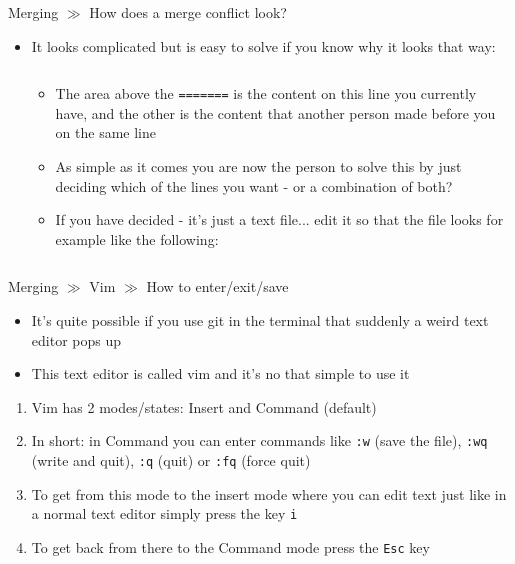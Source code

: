 \documentclass[10pt]{beamer}
\begin{document}
\begin{frame}{Merging $\gg$ How does a merge conflict look?}
\begin{itemize}
	\item It looks complicated but is easy to solve if you know why it looks that way:
	\inputminted[bgcolor=lightGreyCustom,fontsize=\scriptsize]{sh}{./resources/git_merging_04_create_conflict_output.sh}
	\begin{itemize}
		\item The area above the \texttt{=======} is the content on this line you currently have, and the other is the content that another person made before you on the same line
		\item As simple as it comes you are now the person to solve this by just deciding which of the lines you want - or a combination of both?
		\item If you have decided - it's just a text file... edit it so that the file looks for example like the following:
		\inputminted[bgcolor=lightGreyCustom,fontsize=\scriptsize]{sh}{./resources/git_merging_05_create_conflict_solved.sh}
	\end{itemize}
\end{itemize}
\end{frame}

\begin{frame}{Merging $\gg$ Vim $\gg$ How to enter/exit/save}
\begin{itemize}
\item It's quite possible if you use git in the terminal that suddenly a weird text editor pops up
\item This text editor is called vim and it's no that simple to use it
\end{itemize}
\begin{enumerate}
	\item Vim has 2 modes/states: Insert and Command (default)
	\item In short: in Command you can enter commands like \texttt{:w} (save the file), \texttt{:wq} (write and quit), \texttt{:q} (quit) or \texttt{:fq} (force quit)
	\item To get from this mode to the insert mode where you can edit text just like in a normal text editor simply press the key \texttt{i}
	\item To get back from there to the Command mode press the \texttt{Esc} key
\end{enumerate}
\end{frame}
\end{document}
